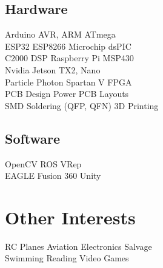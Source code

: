 \documentclass[]{deedy-resume-openfont}
\begin{document}
\begin{minipage}[t]{0.33\textwidth}
\subsection{Hardware}
Arduino AVR, ARM \textbullet{} ATmega \\
ESP32  \textbullet{} ESP8266 \textbullet{} Microchip dsPIC \\
C2000 DSP \textbullet{} Raspberry Pi \textbullet{} MSP430 \\
Nvidia Jetson TX2, Nano \\
Particle Photon \textbullet{} Spartan V FPGA\\
PCB Design \textbullet{} Power PCB Layouts \\
SMD Soldering (QFP, QFN) \textbullet{} 3D Printing \\
\sectionsep

\subsection{Software}
OpenCV \textbullet{} ROS  \textbullet{} VRep \\
EAGLE  \textbullet{} Fusion 360 \textbullet{} Unity\\
\sectionsep

\section{Other Interests}

RC Planes \textbullet{} Aviation \textbullet{} Electronics Salvage\\
Swimming \textbullet{} Reading \textbullet{} Video Games \\

\sectionsep

%

%
%

\end{minipage} 
\end{document}
